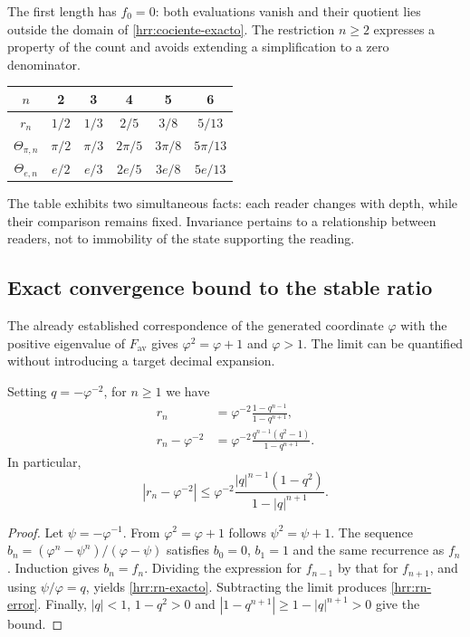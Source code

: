 The first length has \(f_0=0\): both evaluations vanish and their quotient lies outside the domain of \eqref{hrr:cociente-exacto}. The restriction \(n\geq2\) expresses a property of the count and avoids extending a simplification to a zero denominator.

\begin{center}
\begin{tabular}{c|ccccc}
\(n\)&2&3&4&5&6\\\hline
\(r_n\)&\(1/2\)&\(1/3\)&\(2/5\)&\(3/8\)&\(5/13\)\\
\(\Theta_{\pi,n}\)&\(\pi/2\)&\(\pi/3\)&\(2\pi/5\)&\(3\pi/8\)&\(5\pi/13\)\\
\(\Theta_{e,n}\)&\(e/2\)&\(e/3\)&\(2e/5\)&\(3e/8\)&\(5e/13\)
\end{tabular}
\end{center}
The table exhibits two simultaneous facts: each reader changes with depth, while their comparison remains fixed. Invariance pertains to a relationship between readers, not to immobility of the state supporting the reading.

\subsection{Exact convergence bound to the stable ratio}

The already established correspondence of the generated coordinate \(\varphi\) with the positive eigenvalue of \(F_{\mathrm{av}}\) gives \(\varphi^2=\varphi+1\) and \(\varphi>1\). The limit can be quantified without introducing a target decimal expansion.

\begin{proposition}
\label{hrr:error-retorno} Setting \(q=-\varphi^{-2}\), for \(n\geq1\) we have
\begin{align}
 r_n&=\varphi^{-2}\frac{1-q^{n-1}}{1-q^{n+1}},
 \label{hrr:rn-exacto}\\
 r_n-\varphi^{-2}
 &=\varphi^{-2}
 \frac{q^{n-1}(q^2-1)}{1-q^{n+1}}.
 \label{hrr:rn-error}
\end{align}
In particular,
\begin{equation}
 |r_n-\varphi^{-2}|
 \leq\varphi^{-2}
 \frac{|q|^{n-1}(1-q^2)}{1-|q|^{n+1}}.
 \label{hrr:rn-cota}
\end{equation}
\end{proposition}
\begin{proof}
Let \(\psi=-\varphi^{-1}\). From \(\varphi^2=\varphi+1\) follows \(\psi^2=\psi+1\). The sequence \(b_n=(\varphi^n-\psi^n)/(\varphi-\psi)\) satisfies \(b_0=0\), \(b_1=1\) and the same recurrence as \(f_n\). Induction gives \(b_n=f_n\). Dividing the expression for \(f_{n-1}\) by that for \(f_{n+1}\), and using \(\psi/\varphi=q\), yields \eqref{hrr:rn-exacto}. Subtracting the limit produces \eqref{hrr:rn-error}. Finally, \(|q|<1\), \(1-q^2>0\) and \(|1-q^{n+1}|\geq1-|q|^{n+1}>0\) give the bound.
\end{proof}

